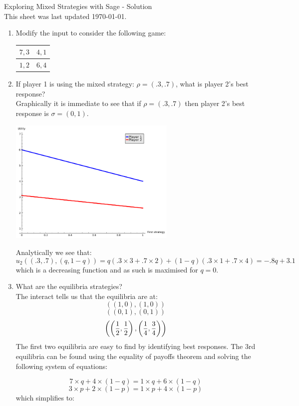 \documentclass[12pt]{article}
\begin{document}
\begin{center}
\Huge{Exploring Mixed Strategies with Sage - Solution\\\tiny{This sheet was last updated \today.} }
\end{center}




\begin{enumerate}
\item Modify the input to consider the following game:
\begin{center}
\begin{tabular}{|c|c|}
\hline
$7,3$&$4,1$\\\hline
$1,2$&$6,4$\\
\hline
\end{tabular}
\end{center}
\item If player 1 is using the mixed strategy: $\rho=(.3,.7)$, what is player 2's best response?\\
Graphically it is immediate to see that if $\rho=(.3,.7)$ then player 2's best response is $\sigma=(0,1)$.
\begin{center}
\includegraphics[width=8cm]{sage15.png}
\end{center}
Analytically we see that:
$$u_2((.3,.7),(q,1-q))=q(.3\times3+.7\times2)+(1-q)(.3\times1+.7\times4)=-.8q+3.1$$
which is a decreasing function and as such is maximised for $q=0$.
\item What are the equilibria strategies?\\
The interact tells us that the equilibria are at:
$$((1,0),(1,0))$$
$$((0,1),(0,1))$$
$$\left(\left({1\over2},{1\over2}\right),\left({1\over4},{3\over 4}\right)\right)$$
The first two equilibria are easy to find by identifying best responses. The 3rd equilibria can be found using the equality of payoffs theorem and solving the following system of equations:

$$7\times q+4\times(1-q)=1\times q+6\times(1-q)$$
$$3\times p+2\times(1-p)=1\times p+4\times(1-p)$$
which simplifies to:


\end{enumerate}
\end{document}
